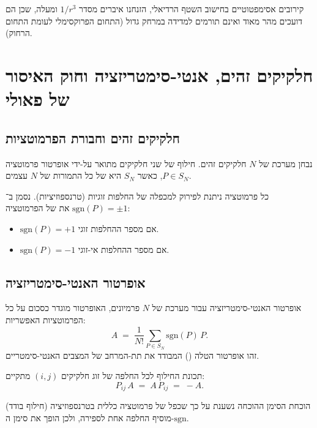 \begin{notebox}{קירובים אסימפטוטיים}
בחישוב השטף הרדיאלי, הזנחנו איברים מסדר $1/r^3$ ומעלה, שכן הם דועכים מהר מאוד ואינם תורמים למדידה במרחק גדול (התחום הפרוקסימלי לעומת התחום הרחוק).
\end{notebox}
\newpage

\section{חלקיקים זהים, אנטי-סימטריזציה וחוק האיסור של פאולי}

\subsection{חלקיקים זהים וחבורת הפרמוטציות}

נבחן מערכת של $N$ חלקיקים זהים. חילוף של שני חלקיקים מתואר על-ידי אופרטור פרמוטציה $P\in S_N$, כאשר $S_N$ היא  של כל התמורות של $N$ עצמים.

כל פרמוטציה ניתנת לפירוק למכפלה של החלפות זוגיות (טרנספוזיציות). נסמן ב־$\mathrm{sgn}(P)=\pm1$ את  של הפרמוטציה:
\begin{itemize}
    \item $\mathrm{sgn}(P)=+1$ אם מספר ההחלפות זוגי.
    \item $\mathrm{sgn}(P)=-1$ אם מספר ההחלפות אי-זוגי.
\end{itemize}



\subsection{אופרטור האנטי-סימטריזציה}

\begin{definitionbox}{אופרטור האנטי-סימטריזציה}
עבור מערכת של $N$ פרמיונים, האופרטור מוגדר כסכום על כל הפרמוטציות האפשריות:
\[
A \;=\; \frac{1}{N!}\sum_{P\in S_N} \mathrm{sgn}(P)\,P .
\]
זהו אופרטור הטלה () המבודד את תת-המרחב של המצבים האנטי-סימטריים.
\end{definitionbox}

\begin{resultbox}{תכונת החילוף}
לכל החלפה של זוג חלקיקים $(i,j)$ מתקיים:
\[
P_{ij}\,A \;=\; A\,P_{ij} \;=\; -A .
\]
\end{resultbox}

\begin{notebox}{הוכחת הסימן}
ההוכחה נשענת על כך שכפל של פרמוטציה כללית בטרנספוזיציה (חילוף בודד) מוסיף החלפה אחת לספירה, ולכן הופך את סימן ה-$\mathrm{sgn}$.
\end{notebox}

